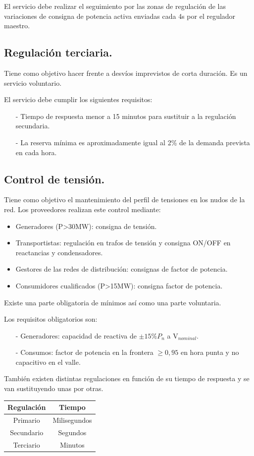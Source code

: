 El servicio debe realizar el seguimiento por las zonas de regulación de las variaciones de consigna de potencia activa enviadas cada 4s por el regulador maestro.
\subsection{Regulación terciaria.}
Tiene como objetivo hacer frente a desvíos imprevistos de corta duración. Es un servicio voluntario.


El servicio debe cumplir los siguientes requisitos:
\begin{itemize}
	\item [-] Tiempo de respuesta menor a 15 minutos para sustituir a la regulación secundaria.
	\item [-] La reserva mínima es aproximadamente igual al 2\% de la demanda prevista en cada hora.
\end{itemize}
\subsection{Control de tensión.}
Tiene como objetivo el mantenimiento del perfil de tensiones en los nudos de la red. Los proveedores realizan este control mediante:
\begin{itemize}
	\item Generadores (P>30MW): consigna de tensión.
	\item Transportistas: regulación en trafos de tensión y consigna ON/OFF en reactancias y condensadores.
	\item Gestores de las redes de distribución: consignas de factor de potencia.
	\item Consumidores cualificados (P>15MW): consigna factor de potencia.
\end{itemize}

Existe una parte obligatoria de mínimos así como una parte voluntaria.



Los requisitos obligatorios son:
\begin{itemize}
	\item [-] Generadores: capacidad de reactiva de $\pm 15\% P_n  $ a V$_{nominal}$.
	\item [-] Consumos: factor de potencia en la frontera $\ge0,95$ en hora punta y no capacitivo en el valle.
\end{itemize}
También existen distintas regulaciones en función de su tiempo de respuesta y se van sustituyendo unas por otras.
\begin{table}[H]
	\centering
	\renewcommand{\arraystretch}{1.5}
	\begin{tabular}{c|c}
		\hline
		Regulación & Tiempo \\
		\hline
		Primario & Milisegundos \\\hline
		Secundario & Segundos \\\hline
		Terciario & Minutos \\\hline
	\end{tabular}
\end{table}
